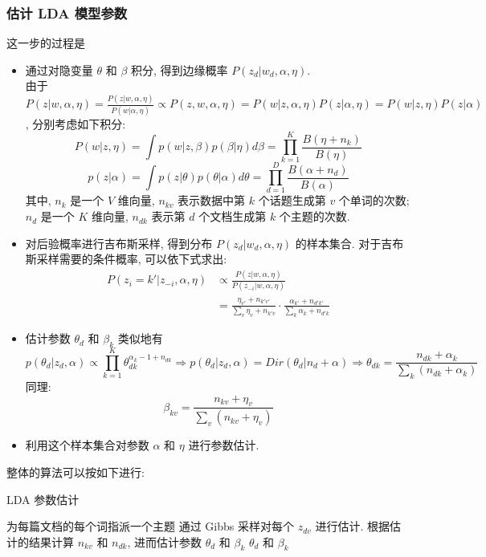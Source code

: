 \documentclass[UTF8]{article}
\begin{document}
\subsubsection{估计 LDA 模型参数}
这一步的过程是
\begin{itemize}
\item 通过对隐变量 $\theta$ 和 $\beta$ 积分, 得到边缘概率 $P(z_d|w_d,\alpha,\eta)$.\\
	由于 $P(z|w,\alpha,\eta)=\frac{P(z|w,\alpha,\eta)}{P(w|\alpha,\eta)}\propto P(z,w,\alpha,\eta)=P(w|z,\alpha,\eta)P(z|\alpha,\eta)=P(w|z,\eta)P(z|\alpha)$, 分别考虑如下积分:
	\begin{equation}
	P(w|z,\eta)=\int p(w|z,\beta)p(\beta|\eta)d\beta=\prod\limits_{k=1}^K\frac{B(\eta+n_k)}{B(\eta)}
	\end{equation}
	\begin{equation}
	p(z|\alpha)=\int p(z|\theta)p(\theta|\alpha)d\theta=\prod\limits_{d=1}^D\frac{B(\alpha+n_d)}{B(\alpha)}
	\end{equation}
	其中, $n_k$ 是一个 $V$ 维向量, $n_{kv}$ 表示数据中第 $k$ 个话题生成第 $v$ 个单词的次数; $n_d$ 是一个 $K$ 维向量, $n_{dk}$ 表示第 $d$ 个文档生成第 $k$ 个主题的次数.
\item 对后验概率进行吉布斯采样, 得到分布 $P(z_d|w_d,\alpha,\eta)$ 的样本集合.
	对于吉布斯采样需要的条件概率, 可以依下式求出:
	\begin{align}P(z_i=k'|z_{-i},\alpha,\eta)&\propto \frac{P(z|w,\alpha, \eta)}{P(z_{-i}|w,\alpha,\eta)}\\
	&=\frac{\eta_{v'}+n_{k'v'}}{\sum_v\eta_v+n_{k'v}}\cdot \frac{\alpha_{k'}+n_{d'k'}}{\sum_k\alpha_k+n_{d'k}}
	\end{align}
\item 估计参数 $\theta_d$ 和 $\beta_k$
	类似地有
	\begin{equation}
	p(\theta_d|z_d,\alpha)\propto\prod\limits_{k=1}^K\theta_{dk}^{\alpha_k-1+n_{dk}}\Rightarrow p(\theta_d|z_d,\alpha)=Dir(\theta_d|n_d+\alpha)\Rightarrow \theta_{dk}=\frac{n_{dk}+\alpha_k}{\sum_k(n_{dk}+\alpha_k)}
	\end{equation}
	同理:
	\begin{equation}
	\beta_{kv}=\frac{n_{kv}+\eta_v}{\sum_v(n_{kv}+\eta_v)}
	\end{equation}
\item 利用这个样本集合对参数 $\alpha$ 和 $\eta$ 进行参数估计.
\end{itemize}
整体的算法可以按如下进行:\par
{\centering
\begin{minipage}{\linewidth*5/7}
\begin{algorithm}[H]
\caption{{\sc LDA 参数估计}}
	\begin{algorithmic}[1]
	\State 为每篇文档的每个词指派一个主题
		\State 通过 Gibbs 采样对每个 $z_{dv}$ 进行估计.
		\State 根据估计的结果计算 $n_{kv}$ 和 $n_{dk}$, 进而估计参数 $\theta_d$ 和 $\beta_k$
	\EndWhile
	\State \Return $\theta_d$ 和 $\beta_k$
	\end{algorithmic}
\end{algorithm}
\end{minipage}
\par}
\end{document}
